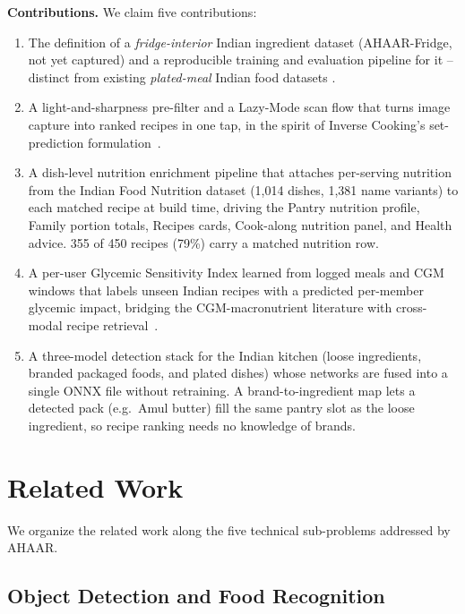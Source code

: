 \documentclass[journal]{IEEEtran}
\begin{document}
\textbf{Contributions.} We claim five contributions:
\begin{enumerate}
  \item The definition of a \emph{fridge-interior} Indian ingredient
        dataset (AHAAR-Fridge, not yet captured) and a reproducible
        training and evaluation pipeline for it -- distinct from
        existing \emph{plated-meal} Indian food datasets
        \cite{foodnet2017,indianfood10,indianfoodnet2023}.
  \item A light-and-sharpness pre-filter and a Lazy-Mode scan flow
        that turns image capture into ranked recipes in one tap, in
        the spirit of Inverse Cooking's set-prediction
        formulation~\cite{salvador2019inverse}.
  \item A dish-level nutrition enrichment pipeline that attaches
        per-serving nutrition from the Indian Food Nutrition dataset
        (1{,}014 dishes, 1{,}381 name variants) to each matched
        recipe at build time, driving the Pantry nutrition profile, Family
        portion totals, Recipes cards, Cook-along nutrition panel,
        and Health advice. 355 of 450 recipes (79\%) carry a
        matched nutrition row.
  \item A per-user Glycemic Sensitivity Index learned from logged
        meals and CGM windows that labels unseen Indian recipes with a
        predicted per-member glycemic impact, bridging the CGM-macronutrient literature
        \cite{huo2019cgm} with cross-modal recipe
        retrieval~\cite{marin2021recipe1m}.
  \item A three-model detection stack for the Indian kitchen
        (loose ingredients, branded packaged foods, and plated
        dishes) whose networks are fused into a single ONNX file
        without retraining. A brand-to-ingredient map lets a
        detected pack (e.g.\ Amul butter) fill the same pantry slot
        as the loose ingredient, so recipe ranking needs no
        knowledge of brands.
\end{enumerate}

\section{Related Work}
\label{sec:related}

We organize the related work along the five technical sub-problems
addressed by AHAAR.

\subsection{Object Detection and Food Recognition}
\end{document}
